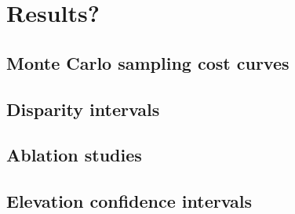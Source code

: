 \chapter{Results?}
\section{Monte Carlo sampling cost curves}
\section{Disparity intervals}
\section{Ablation studies}
\section{Elevation confidence intervals}
\pagebreak